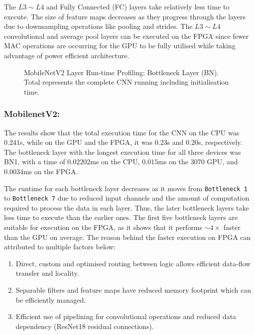 The $L3\sim L4$ and Fully Connected (FC) layers take relatively less time to execute. The size of feature maps decreases as they progress through the layers due to downsampling operations like pooling and strides. The $L3\sim L4$ convolutional and average pool layers can be executed on the FPGA since fewer MAC operations are occurring for the GPU to be fully utilised while taking advantage of power efficient architecture. 


\begin{figure}[tb]
    \centering
\resizebox{\columnwidth}{!}{}    %
    \caption[MobileNetV2, Layer Profiling]{MobileNetV2 Layer Run-time Profiling: Bottleneck Layer (BN). Total represents the complete CNN running including initialisation time.}
    \label{fig:MobilenetLayerRuntime}
\end{figure}

\subsubsection{\textbf{MobilenetV2:}}
The  results show that the total execution time for the CNN on the CPU was $0.241$s, while on the GPU and the FPGA, it was $0.23$s and $0.20$s, respectively. The bottleneck layer with the longest execution time for all three devices was BN1, with a time of $0.02202$ms on the CPU, $0.015$ms on the 3070 GPU, and $0.0034$ms on the FPGA.


The runtime for each bottleneck layer decreases as it moves from \texttt{Bottleneck 1} to \texttt{Bottleneck 7} due to reduced input channels and the amount of computation required to process the data in each layer. Thus, the later bottleneck layers take less time to execute than the earlier ones. The first five bottleneck layers are suitable for execution on the FPGA, as it shows that it performs $\sim4\times$ faster than the GPU on average. The reason behind the faster execution on FPGA can attributed to multiple factors below:
\begin{enumerate}
    \item Direct, custom and optimised routing between logic allows efficient data-flow transfer and locality.
    \item Separable filters and feature maps have reduced memory footprint which can be efficiently managed.
    \item Efficient use of pipelining for convolutional operations and reduced data dependency (\eg ResNet18 residual connections).
\end{enumerate}

